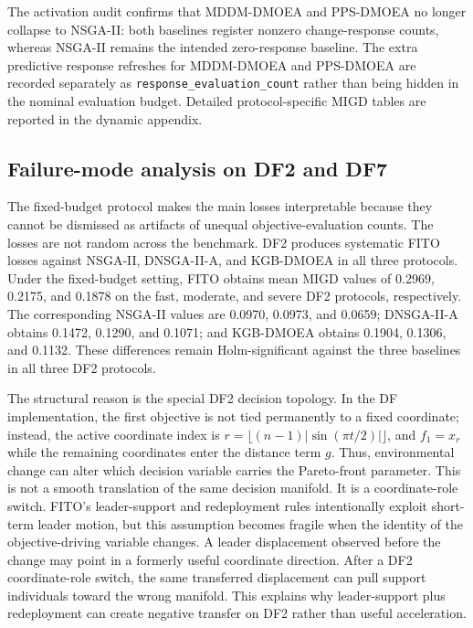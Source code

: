 \documentclass[preprint,12pt]{elsarticle}
\begin{document}
The activation audit confirms that MDDM-DMOEA and PPS-DMOEA no longer collapse to NSGA-II: both baselines register nonzero change-response counts, whereas NSGA-II remains the intended zero-response baseline. The extra predictive response refreshes for MDDM-DMOEA and PPS-DMOEA are recorded separately as \texttt{response\_evaluation\_count} rather than being hidden in the nominal evaluation budget. Detailed protocol-specific MIGD tables are reported in the dynamic appendix.

\subsection{Failure-mode analysis on DF2 and DF7}
\label{subsec:failure-modes}

The fixed-budget protocol makes the main losses interpretable because they cannot be dismissed as artifacts of unequal objective-evaluation counts. The losses are not random across the benchmark. DF2 produces systematic FITO losses against NSGA-II, DNSGA-II-A, and KGB-DMOEA in all three protocols. Under the fixed-budget setting, FITO obtains mean MIGD values of 0.2969, 0.2175, and 0.1878 on the fast, moderate, and severe DF2 protocols, respectively. The corresponding NSGA-II values are 0.0970, 0.0973, and 0.0659; DNSGA-II-A obtains 0.1472, 0.1290, and 0.1071; and KGB-DMOEA obtains 0.1904, 0.1306, and 0.1132. These differences remain Holm-significant against the three baselines in all three DF2 protocols.

The structural reason is the special DF2 decision topology. In the DF implementation, the first objective is not tied permanently to a fixed coordinate; instead, the active coordinate index is $r=\lfloor (n-1)|\sin(\pi t/2)| \rfloor$, and $f_1=x_r$ while the remaining coordinates enter the distance term $g$. Thus, environmental change can alter which decision variable carries the Pareto-front parameter. This is not a smooth translation of the same decision manifold. It is a coordinate-role switch. FITO's leader-support and redeployment rules intentionally exploit short-term leader motion, but this assumption becomes fragile when the identity of the objective-driving variable changes. A leader displacement observed before the change may point in a formerly useful coordinate direction. After a DF2 coordinate-role switch, the same transferred displacement can pull support individuals toward the wrong manifold. This explains why leader-support plus redeployment can create negative transfer on DF2 rather than useful acceleration.
\end{document}
